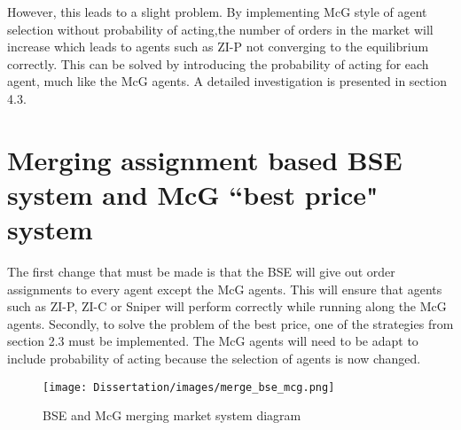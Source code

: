 However, this leads to a slight problem. By implementing McG style of agent selection without probability of acting,the number of orders in the market will increase which leads to agents such as ZI-P not converging to the equilibrium correctly. This can be solved by introducing the probability of acting for each agent, much like the McG agents. A detailed investigation is presented in section 4.3. 

\section{Merging assignment based BSE system and McG ``best price" system}
The first change that must be made is that the BSE will give out order assignments to every agent except the McG agents. This will ensure that agents such as ZI-P, ZI-C or Sniper will perform correctly while running along the McG agents. Secondly, to solve the problem of the best price, one of the strategies from section 2.3 must be implemented. The McG agents will need to be adapt to include probability of acting because the selection of agents is now changed. 


\begin{figure}[!htbp]
\caption{BSE and McG merging market system diagram} 
\texttt{[image: Dissertation/images/merge\_bse\_mcg.png]}
\end{figure} 
\FloatBarrier

%  